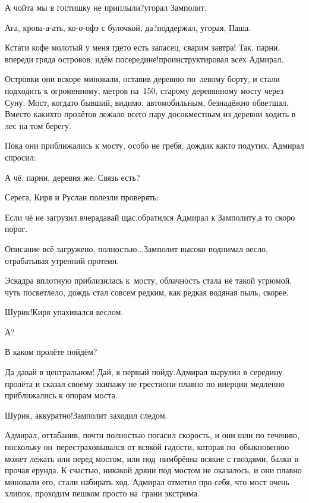 \diagdash А чойта мы в гостишку не приплыли?\mdash угорал Замполит.

\diagdash Ага, крова-а-ать, ко-о-офэ с булочкой, да?\mdash поддержал, угорая, Паша.

\diagdash Кстати кофе молотый у меня где\sdash то есть запасец, сварим завтра! Так, парни, впереди гряда островов, идём посередине!\mdash проинструктировал всех Адмирал.

Островки они вскоре миновали, оставив деревню по~левому борту, и стали подходить к огроменному, метров на~150, старому деревянному мосту через Суну. Мост, когда\sdash то бывший, видимо, автомобильным, безнадёжно обветшал. Вместо каких\sdash то пролётов лежало всего пару досок\mdash местным из деревни ходить в лес на том берегу.

Пока они приближались к мосту, особо не гребя, дождик как\sdash то подутих. Адмирал спросил:

\diagdash А чё, парни, деревня же. Связь есть?

Серега, Киря и Руслан полезли проверять:

\diagdash Если чё не загрузил вчера\mdash давай щас,\mdash обратился Адмирал к Замполиту,\mdash а то скоро порог.

\diagdash Описание всё загружено, полностью$\ldots$\mdash Замполит высоко поднимал весло, отрабатывая утренний протеин.

Эскадра вплотную приблизилась к~мосту, облачность стала не такой угрюмой, чуть посветлело, дождь стал совсем редким, как редкая водяная пыль, скорее. 

\diagdash Шурик!\mdash Киря упахивался веслом.

\diagdash А?

\diagdash В каком пролёте пойдём?

\diagdash Да давай в центральном! Дай, я первый пойду.\mdash Адмирал вырулил в середину пролёта и сказал своему экипажу не грести\mdash они плавно по инерции медленно приближались к опорам моста. 

\diagdash Шурик, аккуратно!\mdash Замполит заходил следом.

Адмирал, оттабанив, почти полностью погасил скорость, и они шли по течению, поскольку он~перестраховывался от всякой гадости, которая по~обыкновению может лежать или перед мостом, или под~ним\mdash брёвна всякие с гвоздями, балки и прочая ерунда. К счастью, никакой дряни под мостом не оказалось, и они плавно миновали его, стали набирать ход. Адмирал отметил про себя, что мост очень хлипок, проходим пешком просто на~грани экстрима.

